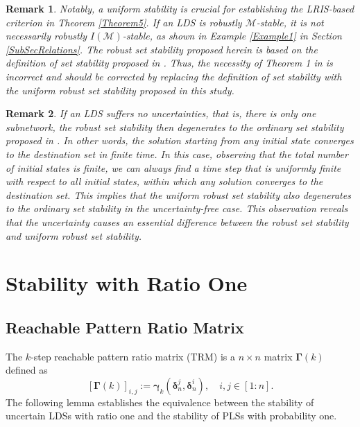 \documentclass[11pt,onecolumn]{article}
\newtheorem{remark}{Remark}
\newcommand{\ddelta}{{\boldsymbol\delta}}
\begin{document}
\begin{remark}

    Notably, a uniform stability is crucial for establishing the LRIS-based criterion in Theorem \ref{Theorem5}. If an LDS is robustly $ \mathcal M$-stable, it is not necessarily robustly $I(\mathcal M)$-stable, as shown in Example \ref{Example1} in Section \ref{SubSecRelations}.
    The robust set stability proposed herein is based on the definition of set stability proposed in \cite{Guo2017Invariant}. Thus, the necessity of Theorem 1 in \cite{Guo2017Invariant} is incorrect and should be corrected by replacing the definition of set stability with the uniform robust set stability proposed in this study.
\end{remark}


\begin{remark}\label{remark1}
If an LDS suffers no uncertainties, that is, there is only one subnetwork, the robust set stability then degenerates to the ordinary set stability proposed in \cite{Guo2015Set}. In other words, the solution starting from any initial state converges to the destination set in finite time. In this case, observing that the total number of initial states is finite, we can always find a time step that is uniformly finite with respect to all initial states, within which any solution converges to the destination set. This implies that the uniform robust set stability also degenerates to the ordinary set stability in the uncertainty-free case. This observation reveals that the uncertainty causes an essential difference between the robust set stability and uniform robust set stability.
\end{remark}



 \section{Stability with Ratio One}\label{SectionStabilityRatioOne}


 \subsection{Reachable Pattern Ratio Matrix}

 The $k$-step reachable pattern ratio matrix (TRM) is a $n\times n$ matrix $\boldsymbol\Gamma(k)$ defined as
  \[[\boldsymbol\Gamma(k)]_{i,j}:=\boldsymbol\gamma_k(\ddelta_n^j,\ddelta_n^i),\quad i,j\in[1:n].\]
  The following lemma establishes the equivalence between the stability of uncertain LDSs with ratio one and the stability of PLSs with probability one.
\end{document}
